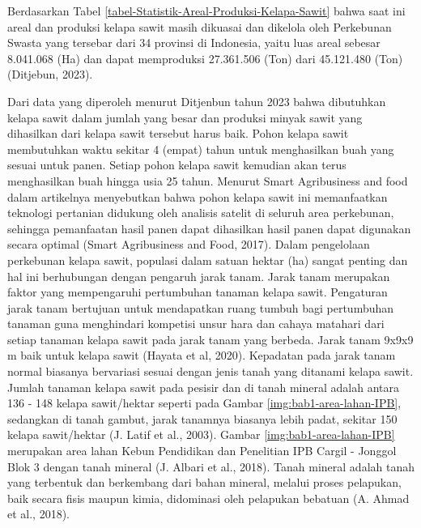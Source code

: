 Berdasarkan Tabel \ref{tabel-Statistik-Areal-Produksi-Kelapa-Sawit} bahwa saat ini areal dan produksi kelapa sawit masih dikuasai dan dikelola oleh Perkebunan Swasta yang tersebar dari 34 provinsi di Indonesia, yaitu luas areal sebesar 8.041.068 (Ha) dan dapat memproduksi 27.361.506 (Ton) dari 45.121.480 (Ton) (Ditjebun, 2023).

Dari data yang diperoleh menurut Ditjenbun tahun 2023 bahwa dibutuhkan kelapa sawit dalam jumlah yang besar dan produksi minyak sawit yang dihasilkan dari kelapa sawit tersebut harus baik. Pohon kelapa sawit membutuhkan waktu sekitar 4 (empat) tahun untuk menghasilkan buah yang sesuai untuk panen. Setiap pohon kelapa sawit kemudian akan terus menghasilkan buah hingga usia 25 tahun. Menurut Smart Agribusiness and food dalam artikelnya menyebutkan bahwa pohon kelapa sawit ini memanfaatkan teknologi pertanian didukung oleh analisis satelit di seluruh area perkebunan, sehingga pemanfaatan hasil panen dapat dihasilkan hasil panen dapat digunakan secara optimal (Smart Agribusiness and Food, 2017). Dalam pengelolaan perkebunan kelapa sawit, populasi dalam satuan hektar (ha) sangat penting dan hal ini berhubungan dengan pengaruh jarak tanam. Jarak tanam merupakan faktor yang mempengaruhi pertumbuhan tanaman kelapa sawit. Pengaturan jarak tanam bertujuan untuk mendapatkan ruang tumbuh bagi pertumbuhan tanaman guna menghindari kompetisi unsur hara dan cahaya matahari dari setiap tanaman kelapa sawit pada jarak tanam yang berbeda. Jarak tanam 9x9x9 m baik untuk kelapa sawit (Hayata et al, 2020). Kepadatan pada jarak tanam normal biasanya bervariasi sesuai dengan jenis tanah yang ditanami kelapa sawit. Jumlah tanaman kelapa sawit pada pesisir dan di tanah mineral adalah antara 136 - 148 kelapa sawit/hektar seperti pada Gambar \ref{img:bab1-area-lahan-IPB}, sedangkan di tanah gambut, jarak tanamnya biasanya lebih padat, sekitar 150 kelapa sawit/hektar (J. Latif et al., 2003). Gambar \ref{img:bab1-area-lahan-IPB} merupakan area lahan Kebun Pendidikan dan Penelitian IPB Cargil - Jonggol Blok 3 dengan tanah mineral (J. Albari et al., 2018). Tanah mineral adalah tanah yang terbentuk dan berkembang dari bahan mineral, melalui proses pelapukan, baik secara fisis maupun kimia, didominasi oleh pelapukan bebatuan (A. Ahmad et al., 2018).

